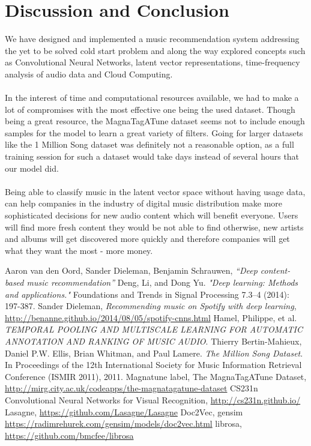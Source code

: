 \documentclass[11pt, a4paper]{article}
\begin{document}
  \section{Discussion and Conclusion}
    We have designed and implemented a music recommendation system addressing
    the yet to be solved cold start problem and along the way explored concepts
    such as Convolutional Neural Networks, latent vector representations,
    time-frequency analysis of audio data and Cloud Computing.
    \\ \\
    \noindent
    In the interest of time and computational resources available, we had to
    make a lot of compromises with the most effective one being the used
    dataset. Though being a great resource, the MagnaTagATune dataset seems not
    to include enough samples for the model to learn a great variety of
    filters. Going for larger datasets like the 1 Million Song dataset was
    definitely not a reasonable option, as a full training session for such a
    dataset would take days instead of several hours that our model did.
    \\ \\
    \noindent
    Being able to classify music in the latent vector space without having
    usage data, can help companies in the industry of digital music
    distribution make more sophisticated decisions for new audio content which
    will benefit everyone. Users will find more fresh content they would be not
    able to find otherwise, new artists and albums will get discovered more
    quickly and therefore companies will get what they want the most - more
    money.

  \begin{thebibliography}{9}
    \sf
      Aaron van den Oord, Sander Dieleman, Benjamin Schrauwen, \emph{``Deep
      content-based music recommendation''}
      Deng, Li, and Dong Yu. \emph{"Deep learning: Methods and applications."}
      Foundations and Trends in Signal Processing 7.3–4 (2014): 197-387.
      Sander Dieleman, \emph{Recommending music on Spotify with deep learning},
      \url{http://benanne.github.io/2014/08/05/spotify-cnns.html}
      Hamel, Philippe, et al. \emph{TEMPORAL POOLING AND MULTISCALE LEARNING
      FOR AUTOMATIC ANNOTATION AND RANKING OF MUSIC AUDIO}.
      Thierry Bertin-Mahieux, Daniel P.W. Ellis, Brian Whitman, and Paul
      Lamere. \emph{The Million Song Dataset}. In Proceedings of the 12th
      International Society for Music Information Retrieval Conference (ISMIR
      2011), 2011.
      Magnatune label, The MagnaTagATune Dataset, \url{
      http://mirg.city.ac.uk/codeapps/the-magnatagatune-dataset}
      CS231n Convolutional Neural Networks for Visual Recognition,
      \url{http://cs231n.github.io/}
      Lasagne, \url{https://github.com/Lasagne/Lasagne}
      Doc2Vec, gensim \url{https://radimrehurek.com/gensim/models/doc2vec.html}
      librosa, \url{https://github.com/bmcfee/librosa}
  \end{thebibliography}
\end{document}
